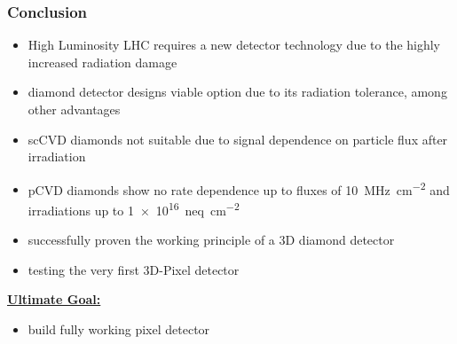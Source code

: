 \begin{frame}
	\frametitle{Conclusion}
	\begin{itemize}
		\setlength{\itemsep}{\fill}
		\item High Luminosity LHC requires a new detector technology due to the highly increased radiation damage 
		\item diamond detector designs viable option due to its radiation tolerance, among other advantages
		\item scCVD diamonds not suitable due to signal dependence on particle flux after irradiation
		\item pCVD diamonds show no rate dependence up to fluxes of \SI{10}{\mega\hertz\per cm^2} and irradiations up to \SI{1e16}{neq\per cm^2}
		\item successfully proven the working principle of a 3D diamond detector
		\item testing the very first 3D-Pixel detector
	\end{itemize}
	\vspace*{5pt}
	\textbf{\underline{Ultimate Goal:}}
	\begin{itemize}
		\item build fully working pixel detector
	\end{itemize}
\end{frame}